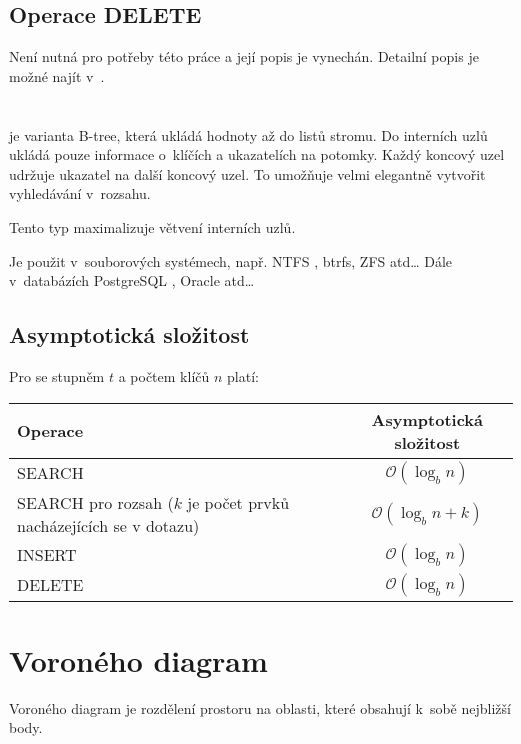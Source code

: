 \subsection{Operace DELETE}

Není nutná pro potřeby této práce a její popis je vynechán.
Detailní popis je možné najít v~\cite{Cormen:2001:IA:580470}.


\section{\BPTree\label{sec:B-plus-tree}}

\BPTree{} je varianta B-tree, která ukládá hodnoty až do
listů stromu. Do interních uzlů ukládá pouze informace o~klíčích
a ukazatelích na potomky. Každý koncový uzel udržuje ukazatel na další
koncový uzel. To umožňuje velmi elegantně vytvořit vyhledávání v~rozsahu.

Tento typ maximalizuje větvení interních uzlů.

Je použit v~souborových systémech, např. NTFS \cite{Carrier:2005:FSF:1051914}, btrfs, ZFS \cite{Powell:2012:ZBQ:2328941.2328946} atd\ldots{}
Dále v~databázích PostgreSQL \cite{Geschwinde:2001:PDH:580250}, Oracle \cite{Kyte:2003:EOD:1593880} atd\ldots{}


\begin{figure}[t]
\caption{\BPTree}
\end{figure}

\subsection{Asymptotická složitost}
Pro \BPTree{} se stupněm $t$ a počtem klíčů $n$ platí:
\begin{center}
\begin{tabular}{|p{4cm}|c|}
\hline 
Operace & Asymptotická složitost \\
\hline 
\hline 
SEARCH & $\mathcal{O}(\log_b n)$ \\
\hline 
SEARCH pro rozsah ($k$ je počet prvků nacházejících se v dotazu) & $\mathcal{O}(\log_b n + k)$ \\
\hline 
INSERT & $\mathcal{O}(\log_b n)$ \\
\hline 
DELETE & $\mathcal{O}(\log_b n)$ \\
\hline 
\end{tabular}
\end{center}

\section{Voroného diagram}
Voroného diagram je rozdělení prostoru na oblasti, které obsahují k~sobě nejbližší body\cite{dorst2010geometric}.
